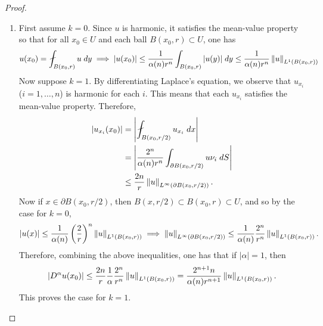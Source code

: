 \documentclass{article}
\begin{document}
\begin{itemize}
\begin{proof}
			\begin{enumerate}[itemsep = -2pt,label = (\arabic{*})]
				\item First assume $k = 0$. Since $u$ is harmonic, it satisfies the mean-value property so that for all $x_{0} \in U$ and each ball $B(x_{0}, r) \subset U$, one has 
				\begin{equation*}
					u(x_{0}) = \fint_{B(x_{0}, r)}u\;dy \implies |u(x_{0})| \leq \frac{1}{\alpha(n)r^{n}}\int_{B(x_{0}, r)}|u(y)|\;dy \leq \frac{1}{\alpha(n)r^{n}}\norm{u}_{L^{1}(B(x_{0}, r))}
				\end{equation*}
				Now suppose $k = 1$. By differentiating Laplace's equation, we observe that $u_{x_{i}}$ ($i = 1, \ldots, n$) is harmonic for each $i$. This means that each $u_{x_{i}}$ satisfies the mean-value property. Therefore, 
				\begin{align*}
					\begin{split}
						|u_{x_{i}}(x_{0})| &= \abs{\fint_{B(x_{0}, r/2)}u_{x_{i}}\;dx} \\
						&= \abs{\frac{2^{n}}{\alpha(n)r^{n}}\int_{\partial B(x_{0}, r/2)}u\nu_{i}\;dS}  \\
						&\leq \frac{2n}{r}\norm{u}_{L^{\infty}(\partial B(x_{0}, r/2))}. 
					\end{split}
				\end{align*}
				Now if $x \in \partial B(x_{0}, r/2)$, then $B(x, r/2) \subset B(x_{0}, r) \subset U$, and so by the case for $k = 0$, 
				\begin{equation*}
					|u(x)| \leq \frac{1}{\alpha(n)}\left(\frac{2}{r}\right)^{n}\left\Vert u \right\Vert_{L^{1}(B(x_{0}, r))} \implies \left\Vert u \right\Vert_{L^{\infty}(\partial B (x_{0}, r/2))} \leq \frac{1}{\alpha(n)}\frac{2^{n}}{r^{n}}\left\Vert u \right\Vert_{L^{1}(B(x_{0},r))}. 
				\end{equation*}
				Therefore, combining the above inequalities, one has that if $|\alpha| = 1$, then 
				\begin{equation*}
					|D^{\alpha}u(x_{0})| \leq \frac{2n}{r}\frac{1}{\alpha}\frac{2^{n}}{r^{n}}\left\Vert u \right\Vert_{L^{1}(B(x_{0}, r))} = \frac{2^{n+1}n}{\alpha(n)r^{n+1}}\left\Vert u \right\Vert_{L^{1}(B(x_{0},r))}. 
				\end{equation*}
				This proves the case for $k = 1$. 
				

\end{enumerate}
\end{proof}
\end{itemize}
\end{document}
